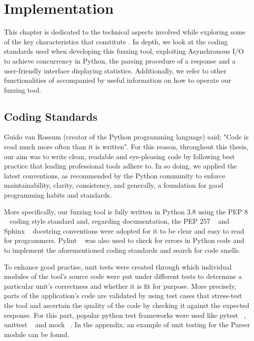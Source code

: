 \chapter{Implementation}
\label{sec:implementation}
\minitoc
\vspace*{1cm}

This chapter is dedicated to the technical aspects involved while exploring some of the key characteristics that constitute \pname{}. In depth, we look at the coding standards used when developing this fuzzing tool, exploiting Asynchronous I/O to achieve concurrency in Python, the parsing procedure of a response and a user-friendly interface displaying statistics. Additionally, we refer to other functionalities of \pname{} accompanied by useful information on how to operate our fuzzing tool.

\section{Coding Standards}
Guido van Rossum (creator of the Python programming language) said; "Code is read much more often than it is written". For this reason, throughout this thesis, our aim was to write clean, readable and eye-pleasing code by following best practice that leading professional tools adhere to. In so doing, we applied the latest conventions, as recommended by the Python community to enforce maintainability, clarity, consistency, and generally, a foundation for good programming habits and standards. 

More specifically, our fuzzing tool is fully written in Python 3.8 using the PEP 8 ~\cite{python_pep8} coding style standard and, regarding documentation, the PEP 257 ~\cite{python_pep257} and Sphinx ~\cite{sphinx} docstring conventions were adopted for it to be clear and easy to read for programmers. Pylint ~\cite{pylint_module} was also used to check for errors in Python code and to implement the aforementioned coding standards and search for code smells.

To enhance good practise, unit tests were created through which individual modules of the tool's source code were put under different tests to determine a particular unit's correctness and whether it is fit for purpose. More precisely, parts of the application's code are validated by using test cases that stress-test the tool and ascertain the quality of the code by checking it against the expected response. For this part, popular python test frameworks were used like pytest ~\cite{pytest_module}, unittest ~\cite{unittest_module} and mock ~\cite{mock}. In the appendix, an example of unit testing for the Parser module can be found.


